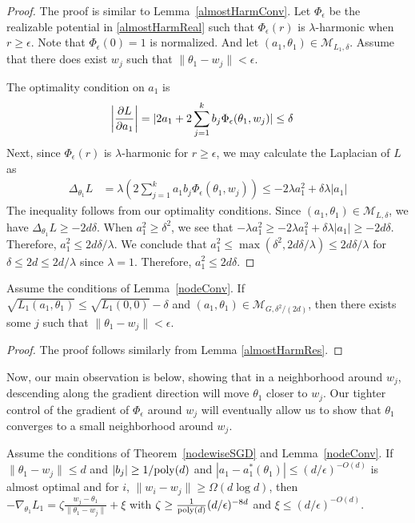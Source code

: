 \begin{proof}
The proof is similar to Lemma~\ref{almostHarmConv}. Let $\Phi_\epsilon$ be the realizable potential in \ref{almostHarmReal} such that $\Phi_\epsilon(r)$ is $\lambda$-harmonic when $r \geq \epsilon$. Note that $\Phi_\epsilon(0) = 1$ is normalized. And let $(a_1,\theta_1) \in \mathcal{M}_{L_1,\delta}$. Assume that there does exist $w_j$ such that $\|\theta_1 - w_j\| < \epsilon$. 
 
The optimality condition on ${ a_1}$ is
\begin{align*}
   \left| \frac{\partial L}{\partial a_1} \right| & = \lvert 2a_1  + 2\sum_{j=1}^k b_j \Phi_\epsilon(\theta_1,w_j) \rvert \leq \delta
\end{align*}
%
Next, since $\Phi_\epsilon(r)$ is $\lambda$-harmonic for $r \geq \epsilon$, we may calculate the Laplacian of $L$ as
%
\begin{align*}
\Delta_{\theta_1} L & = \lambda \left(2\sum_{j=1}^k a_1b_j
  \Phi_\epsilon(\theta_1, w_j) \right) 
 \leq  -2\lambda a_1^2 + \delta \lambda |a_1| 
\end{align*} 
%
The inequality follows from our optimality conditions. Since ${(a_1,\theta_1)} \in \mathcal{M}_{L,\delta}$, we have $\Delta_{\theta_1} L \geq - 2d\delta$. When $a_1^2 \geq \delta^2$, we see that $-\lambda a_1^2 \geq -2 \lambda a_1^2 + \delta\lambda |a_1| \geq -2d\delta$. Therefore, $a_1^2 \leq 2d\delta/\lambda$. We conclude that $a_1^2 \leq \max(\delta^2, 2d\delta/\lambda) \leq 2d\delta/\lambda$ for $\delta\leq 2d \leq 2d/\lambda$ since $\lambda = 1$. Therefore, $a_1^2 \leq 2d\delta$.
\end{proof}
%
\begin{lemma}\label{nodeRes}
Assume the conditions of Lemma~\ref{nodeConv}. If
$\sqrt{L_1(a_1,\theta_1)} \leq \sqrt{L_1(0, 0)} - \delta$
  and $(a_1,\theta_1) \in \mathcal{M}_{G,\delta^2/(2d)}$,
  then there exists some $j$ such that $\|\theta_1 - w_j\| <\epsilon$.
\end{lemma}
%
\begin{proof}
The proof follows similarly from Lemma \ref{almostHarmRes}.
\end{proof}
 Now, our main observation is below, showing that in a neighborhood around $w_j$, descending along the gradient direction will move $\theta_1$ closer to $w_j$. Our tighter control of the gradient of $\Phi_{\epsilon}$ around $w_j$ will eventually allow us to show that $\theta_1$ converges to a small neighborhood around $w_j$. 
 
\begin{lemma}\label{nodeGradient}
Assume the conditions of Theorem~\ref{nodewiseSGD} and Lemma~\ref{nodeConv}. If $\|\theta_1 - w_j\| \leq d$ and $|b_j|\geq 1/\mathrm{poly}(d)$ and $|a_1 - a_1^*(\theta_1)| \leq (d/\epsilon)^{-O(d)}$ is almost optimal and for $i$, $\|w_i - w_j\| \geq \Omega(d \log d)$, then $-\nabla_{\theta_1}L_1 = \zeta \frac{w_j - \theta_1}{\|\theta_1 - w_j\|} + \xi$ with $\zeta \geq  \frac{1}{\mathrm{poly}(d)}(d/\epsilon)^{-8d}$ and $\xi \leq (d/\epsilon)^{-O(d)}$. 
\end{lemma}

